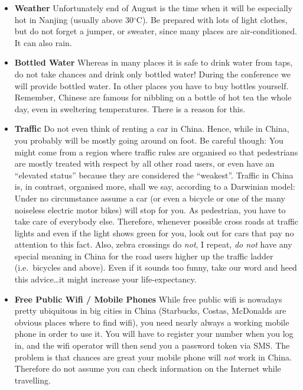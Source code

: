\documentclass[11pt]{report}
\begin{document}
\begin{itemize}
\item \textbf{Weather}\hspace{3mm} 
Unfortunately end of August is the time when it will be especially
hot in Nanjing (usually above 30$^{\circ}$C). Be prepared with lots of
light clothes, but do not forget a jumper, or sweater, since many
places are air-conditioned. It can also rain.


\item \textbf{Bottled Water}\hspace{3mm}
Whereas in many places it is safe to drink water from taps,
do not take chances and drink only bottled water! During the
conference we will provide bottled water. In other places you
have to buy bottles yourself. Remember, Chinese are famous for
nibbling on a bottle of hot tea the whole day, even in sweltering 
temperatures. There is a reason for this. 

\item \textbf{Traffic}\hspace{3mm} 
Do not even think of renting a car in China. Hence, while in
China, you probably will be mostly going around on foot. Be
careful though: You might come from a region where traffic
rules are organised so that pedestrians are mostly treated
with respect by all other road users, or even have an
``elevated status'' because they are considered the
``weakest''. Traffic in China is, in contrast, organised more,
shall we say, according to a Darwinian model: Under no
circumstance assume a car (or even a bicycle or one of the
many noiseless electric motor bikes) will stop for you. As
pedestrian, you have to take care of everybody else.
Therefore, whenever possible cross roads at traffic lights and
even if the light shows green for you, look out for cars that
pay no attention to this fact. Also, zebra crossings do
\emph{not}, I repeat, \emph{do not} have any special meaning
in China for the road users higher up the traffic ladder
(i.e.~bicycles and above). Even if it sounds too funny, take
our word and heed this advice\ldots{}it might increase your
life-expectancy. 

\item \textbf{Free Public Wifi / Mobile Phones}\hspace{3mm}
While free public wifi is nowadays pretty ubiquitous in big
cities in China (Starbucks, Costas, McDonalds are obvious
places where to find wifi), you need nearly always a working mobile phone in
order to use it. You will have to register your number when
you log in, and the wifi operator will then send you a
password token via SMS. The problem is that chances are great
your mobile phone will \emph{not} work in China. Therefore do
not assume you can check information on the Internet while
travelling. 


\end{itemize}
\end{document}
